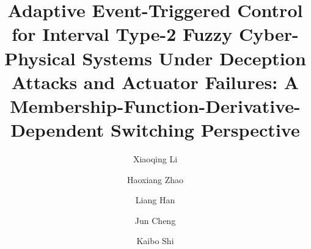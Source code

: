 \documentclass[preprint,review,fleqn,sort&compress,3p]{elsarticle}
\theoremstyle{definition} %
\theoremstyle{definition}%
\begin{document}
	\begin{frontmatter}
		
		\title{{Adaptive Event-Triggered Control for 
				Interval Type-2 Fuzzy Cyber-Physical Systems Under Deception Attacks 
				and Actuator Failures: A Membership-Function-Derivative-Dependent 
				Switching Perspective
		}}
		
		\author[a]{Xiaoqing Li}
		\author[a]{Haoxiang Zhao}
		\author[a]{Liang Han}
		\author[b]{Jun Cheng}
		\author[c]{Kaibo Shi}
		
		\address[a]{School of Electrical Engineering and Automation, Hefei University of Technology, Hefei 230009, China}
		\address[b]{College of Mathematics and Statistics, Guangxi Normal University, Guilin 541006, China}
		\address[c]{School of Electronic Information and Electrical Engineering, Chengdu University, Chengdu 610106, China}
		
		{}
		

\end{frontmatter}
\end{document}
